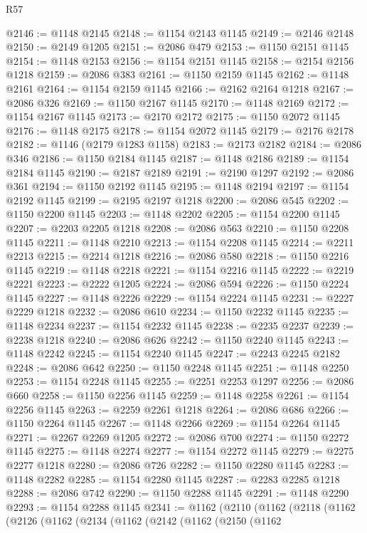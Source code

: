 \begin{lexlean}{R57}
\begin{coremodule}
@2146 := @1148 @2145
@2148 := @1154 @2143 @1145
@2149 := @2146 @2148
@2150 := @2149 @1205
@2151 := @2086 @479
@2153 := @1150 @2151 @1145
@2154 := @1148 @2153
@2156 := @1154 @2151 @1145
@2158 := @2154 @2156 @1218
@2159 := @2086 @383
@2161 := @1150 @2159 @1145
@2162 := @1148 @2161
@2164 := @1154 @2159 @1145
@2166 := @2162 @2164 @1218
@2167 := @2086 @326
@2169 := @1150 @2167 @1145
@2170 := @1148 @2169
@2172 := @1154 @2167 @1145
@2173 := @2170 @2172
@2175 := @1150 @2072 @1145
@2176 := @1148 @2175
@2178 := @1154 @2072 @1145
@2179 := @2176 @2178
@2182 := @1146 (@2179 @1283 @1158)
@2183 := @2173 @2182
@2184 := @2086 @346
@2186 := @1150 @2184 @1145
@2187 := @1148 @2186
@2189 := @1154 @2184 @1145
@2190 := @2187 @2189
@2191 := @2190 @1297
@2192 := @2086 @361
@2194 := @1150 @2192 @1145
@2195 := @1148 @2194
@2197 := @1154 @2192 @1145
@2199 := @2195 @2197 @1218
@2200 := @2086 @545
@2202 := @1150 @2200 @1145
@2203 := @1148 @2202
@2205 := @1154 @2200 @1145
@2207 := @2203 @2205 @1218
@2208 := @2086 @563
@2210 := @1150 @2208 @1145
@2211 := @1148 @2210
@2213 := @1154 @2208 @1145
@2214 := @2211 @2213
@2215 := @2214 @1218
@2216 := @2086 @580
@2218 := @1150 @2216 @1145
@2219 := @1148 @2218
@2221 := @1154 @2216 @1145
@2222 := @2219 @2221
@2223 := @2222 @1205
@2224 := @2086 @594
@2226 := @1150 @2224 @1145
@2227 := @1148 @2226
@2229 := @1154 @2224 @1145
@2231 := @2227 @2229 @1218
@2232 := @2086 @610
@2234 := @1150 @2232 @1145
@2235 := @1148 @2234
@2237 := @1154 @2232 @1145
@2238 := @2235 @2237
@2239 := @2238 @1218
@2240 := @2086 @626
@2242 := @1150 @2240 @1145
@2243 := @1148 @2242
@2245 := @1154 @2240 @1145
@2247 := @2243 @2245 @2182
@2248 := @2086 @642
@2250 := @1150 @2248 @1145
@2251 := @1148 @2250
@2253 := @1154 @2248 @1145
@2255 := @2251 @2253 @1297
@2256 := @2086 @660
@2258 := @1150 @2256 @1145
@2259 := @1148 @2258
@2261 := @1154 @2256 @1145
@2263 := @2259 @2261 @1218
@2264 := @2086 @686
@2266 := @1150 @2264 @1145
@2267 := @1148 @2266
@2269 := @1154 @2264 @1145
@2271 := @2267 @2269 @1205
@2272 := @2086 @700
@2274 := @1150 @2272 @1145
@2275 := @1148 @2274
@2277 := @1154 @2272 @1145
@2279 := @2275 @2277 @1218
@2280 := @2086 @726
@2282 := @1150 @2280 @1145
@2283 := @1148 @2282
@2285 := @1154 @2280 @1145
@2287 := @2283 @2285 @1218
@2288 := @2086 @742
@2290 := @1150 @2288 @1145
@2291 := @1148 @2290
@2293 := @1154 @2288 @1145
@2341 := @1162
    (@2110
      (@1162
        (@2118
          (@1162
            (@2126
              (@1162
                (@2134
                  (@1162
                    (@2142
                      (@1162
                        (@2150
                          (@1162

\end{coremodule}
\end{lexlean}
